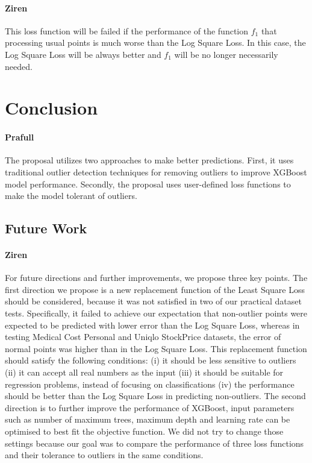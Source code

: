 \documentclass[runningheads]{llncs}
\begin{document}
\paragraph{Ziren}This loss function will be failed if the performance of the function $f_1$ that processing usual points is much worse than the Log Square Loss. In this case, the Log Square Loss will be always better and $f_1$ will be no longer necessarily needed. 

\section{Conclusion}
\paragraph{Prafull} The proposal utilizes two approaches to make better predictions. First, it uses traditional outlier detection techniques for removing outliers to improve XGBoost model performance. Secondly, the proposal uses user-defined loss functions to make the model tolerant of outliers.


\subsection{Future Work}

\paragraph{Ziren}For future directions and further improvements, we propose three key points. The first direction we propose is a new replacement function of the Least Square Loss should be considered, because it was not satisfied in two of our practical dataset tests. Specifically, it failed to achieve our expectation that non-outlier points were expected to be predicted with lower error than the Log Square Loss, whereas in testing Medical Cost Personal and Uniqlo StockPrice datasets, the error of normal points was higher than in the Log Square Loss. This replacement function should satisfy the following conditions: (i) it should be less sensitive to outliers (ii) it can accept all real numbers as the input (iii) it should be suitable for regression problems, instead of focusing on classifications (iv) the performance should be better than the Log Square Loss in predicting non-outliers. The second direction is to further improve the performance of XGBoost, input parameters such as number of maximum trees, maximum depth and learning rate can be optimised to best fit the objective function. We did not try to change those settings because our goal was to compare the performance of three loss functions and their tolerance to outliers in the same conditions. 




%
%

%
%
%
% 
% 
%
\end{document}
